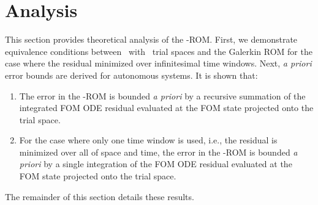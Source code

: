 \section{Analysis}\label{sec:analysis}
This section provides theoretical analysis of the \methodAcronym-ROM. First, we demonstrate equivalence conditions 
between \methodAcronym\  with \spatialAcronym\ trial spaces and the Galerkin ROM for the case where the residual minimized over infinitesimal time windows.
Next, \textit{a priori} error bounds are derived for autonomous systems. It is shown that:
\begin{enumerate}
\item The error in the \methodAcronym-ROM is bounded \textit{a priori} by a recursive summation of the integrated FOM ODE residual evaluated at the FOM state projected onto the trial space. 
\item For the case where only 
one time window is used, i.e., the residual is minimized over all of space and time, the error in the \methodAcronym-ROM is bounded \textit{a priori} by a single 
integration of the FOM ODE residual evaluated at the FOM state projected onto the trial space. 
\end{enumerate}
The remainder of this section details these results. 

